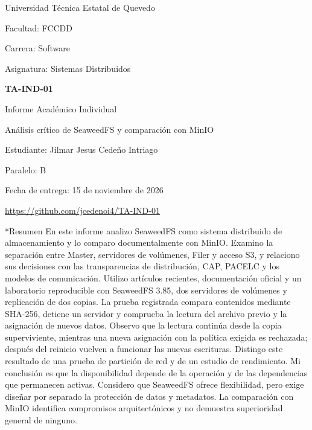 \documentclass[11pt,a4paper]{article}
\makeatletter
\renewcommand\section{\@startsection{section}{1}{\z@}{-1.5ex plus -.3ex minus -.2ex}{.7ex plus .2ex}{\normalfont\large\bfseries}}
\makeatother
\begin{document}
\hypersetup{pageanchor=false}

\begin{titlepage}
\centering
{\Large Universidad Técnica Estatal de Quevedo\par}
\vspace{0.5cm}
Facultad: FCCDD\par
Carrera: Software\par
Asignatura: Sistemas Distribuidos\par
\vfill
{\LARGE\bfseries TA-IND-01\par}
\vspace{0.5cm}
{\Large Informe Académico Individual\par}
\vspace{0.5cm}
{\Large Análisis crítico de SeaweedFS y comparación con MinIO\par}
\vfill
Estudiante: Jilmar Jesus Cedeño Intriago\par
Paralelo: B\par
Fecha de entrega: 15 de noviembre de 2026\par
\vspace{0.5cm}
\url{https://github.com/jcedenoi4/TA-IND-01}\par
\end{titlepage}
\hypersetup{pageanchor=true}

\section*{Resumen}
En este informe analizo SeaweedFS como sistema distribuido de almacenamiento y lo comparo documentalmente con MinIO. Examino la separación entre Master, servidores de volúmenes, Filer y acceso S3, y relaciono sus decisiones con las transparencias de distribución, CAP, PACELC y los modelos de comunicación. Utilizo artículos recientes, documentación oficial y un laboratorio reproducible con SeaweedFS 3.85, dos servidores de volúmenes y replicación de dos copias. La prueba registrada compara contenidos mediante SHA-256, detiene un servidor y comprueba la lectura del archivo previo y la asignación de nuevos datos. Observo que la lectura continúa desde la copia superviviente, mientras una nueva asignación con la política exigida es rechazada; después del reinicio vuelven a funcionar las nuevas escrituras. Distingo este resultado de una prueba de partición de red y de un estudio de rendimiento. Mi conclusión es que la disponibilidad depende de la operación y de las dependencias que permanecen activas. Considero que SeaweedFS ofrece flexibilidad, pero exige diseñar por separado la protección de datos y metadatos. La comparación con MinIO identifica compromisos arquitectónicos y no demuestra superioridad general de ninguno.
\end{document}
